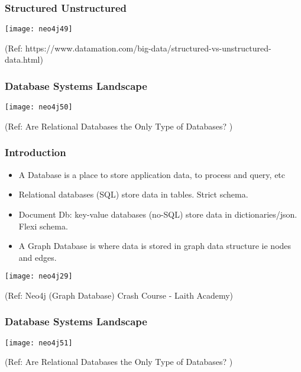 \begin{frame}\frametitle{Structured Unstructured}


\begin{center}
\texttt{[image: neo4j49]}
\end{center}	

{\tiny (Ref: https://www.datamation.com/big-data/structured-vs-unstructured-data.html)}
\end{frame}

\begin{frame}\frametitle{Database Systems Landscape }


\begin{center}
\texttt{[image: neo4j50]}
\end{center}	

{\tiny (Ref: Are Relational Databases the Only Type of Databases? )}

\end{frame}



\begin{frame}\frametitle{Introduction}

\begin{itemize}
\item A Database is a place to store application data, to process and query, etc

\item Relational databases (SQL) store data in tables. Strict schema.
\item Document Db: key-value databases (no-SQL) store data in dictionaries/json. Flexi schema.
\item A Graph Database is where data is stored in graph data structure ie nodes and edges.
\end{itemize}

\begin{center}
\texttt{[image: neo4j29]}
\end{center}	

{\tiny (Ref: Neo4j (Graph Database) Crash Course - Laith Academy)}
\end{frame}


\begin{frame}\frametitle{Database Systems Landscape }


\begin{center}
\texttt{[image: neo4j51]}
\end{center}	

{\tiny (Ref: Are Relational Databases the Only Type of Databases? )}

\end{frame}


